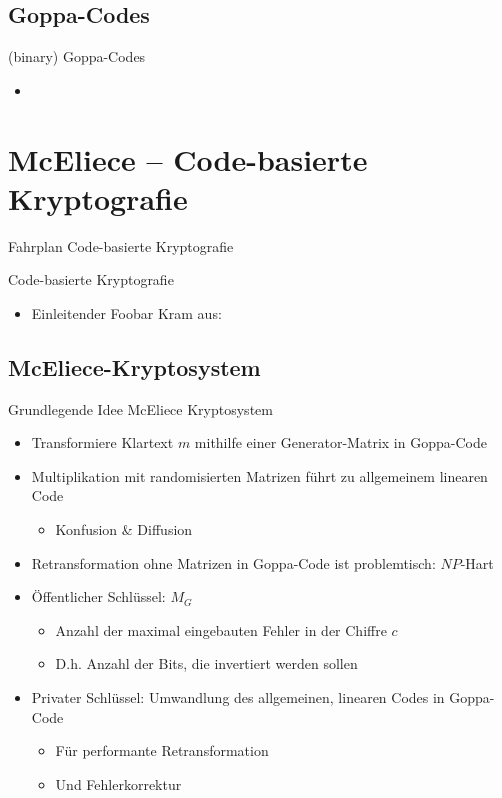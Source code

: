 \documentclass[11pt%
,aspectratio=169%
]{beamer}
\begin{document}
\subsection{Goppa-Codes}
\begin{frame}{(binary) Goppa-Codes}
	\begin{itemize}
		\item 
	\end{itemize}
\end{frame}

\section{McEliece -- Code-basierte Kryptografie}

\begin{frame}{Fahrplan Code-basierte Kryptografie}
\end{frame}

\begin{frame}{Code-basierte Kryptografie}
	\begin{itemize}
		\item Einleitender Foobar Kram aus: \cite{Stinson2018Cryptography}
	\end{itemize}
\end{frame}

\subsection{McEliece-Kryptosystem}

\begin{frame}{Grundlegende Idee McEliece Kryptosystem}
	\begin{itemize}
		\item Transformiere Klartext $m$ mithilfe einer Generator-Matrix in Goppa-Code
		\item Multiplikation mit randomisierten Matrizen führt zu allgemeinem linearen Code
		\begin{itemize}
		    \item Konfusion \& Diffusion
		\end{itemize}
		\item Retransformation ohne Matrizen in Goppa-Code ist problemtisch: $NP$-Hart
        \item Öffentlicher Schlüssel: $M_G$
        \begin{itemize}
            \item Anzahl der maximal eingebauten Fehler in der Chiffre $c$
            \item D.h. Anzahl der Bits, die invertiert werden sollen
        \end{itemize}
	    \item Privater Schlüssel: Umwandlung des allgemeinen, linearen Codes in Goppa-Code
	    \begin{itemize}
	        \item Für performante Retransformation
	        \item Und Fehlerkorrektur
	    \end{itemize}
	\end{itemize}
\end{frame}
\end{document}
